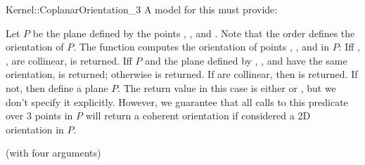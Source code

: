 \begin{ccRefFunctionObjectConcept}{Kernel::CoplanarOrientation_3}
A model for this must provide:


         {Let $P$ be the plane defined by the points , ,
          and . Note that the order defines the orientation of
          $P$. The function computes the orientation of points , 
          , and  in $P$: Iff , ,  are
          collinear,  is returned. Iff $P$ and the plane 
          defined by , , and  have the same orientation, 
           is returned; otherwise  is returned.  
          }
{If  are collinear, then  is returned.
If not, then  define a plane $P$.  The return value in this case is
either  or , but we don't specify it explicitly.
However, we guarantee that all calls to this predicate over 3 points in $P$
will return a coherent orientation if considered a 2D orientation in $P$.}


\ccRefines
{} (with four arguments)

\ccSeeAlso
{}\\

\end{ccRefFunctionObjectConcept}

